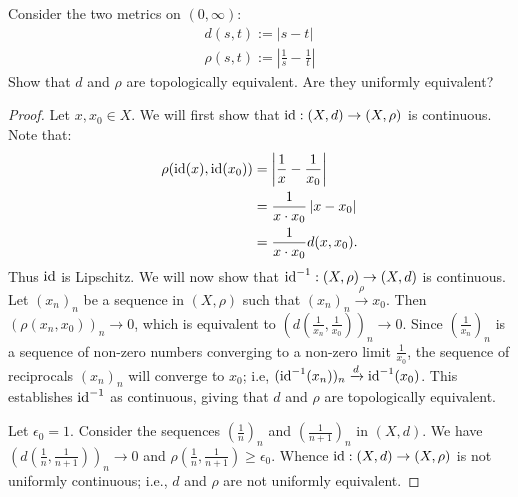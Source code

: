 \documentclass[11pt,twoside,openany]{memoir}
\begin{document}
    \addtocounter{exercise}{1}
    \iffalse
    \begin{exercise}
        Let $(X,d)$ be a metric space, $f,g:X \rightarrow F$ continuous maps, and $a \in F$. Show that $f+g$, $fg$, and $\alpha f$ are continuous.
    \end{exercise}
        \begin{proof}
            
        \end{proof}
    \fi
    \begin{exercise}
        Consider the two metrics on $(0,\infty)$:
            \begin{equation*}
            \begin{split}
                d(s,t) := |s-t| \\
                \rho(s,t) := \left| \frac{1}{s} - \frac{1}{t} \right|
            \end{split}
            \end{equation*}
        Show that $d$ and $\rho$ are topologically equivalent. Are they uniformly equivalent?
    \end{exercise}
        \begin{proof}
            Let $x,x_0 \in X$. We will first show that $\operatorname{id}:(X,d) \rightarrow (X,\rho)$ is continuous. Note that:
                \begin{equation*}
                \begin{split}
                    \rho(\operatorname{id}(x),\operatorname{id}(x_0)) 
                    & = \left| \frac{1}{x} - \frac{1}{x_0} \right| \\
                    & = \frac{1}{x \cdot x_0} \left|x - x_0\right| \\
                    & = \frac{1}{x \cdot x_0} d(x,x_0).
                \end{split}
                \end{equation*}
            Thus $\operatorname{id}$ is Lipschitz. We will now show that $\operatorname{id}^{-1}:(X,\rho) \rightarrow (X,d)$ is continuous. Let $(x_n)_n$ be a sequence in $(X,\rho)$ such that $(x_n)_n \xrightarrow{\rho} x_0$. Then $(\rho(x_n,x_0))_n \rightarrow 0$, which is equivalent to $\left( d \left( \frac{1}{x_n}, \frac{1}{x_0} \right) \right)_n \rightarrow 0$. Since $\left( \frac{1}{x_n} \right)_n $ is a sequence of non-zero numbers converging to a non-zero limit $\frac{1}{x_0}$, the sequence of reciprocals $(x_n)_n$ will converge to $x_0$; i.e, $(\operatorname{id}^{-1}(x_n))_n \xrightarrow{d} \operatorname{id}^{-1}(x_0)$. This establishes $\operatorname{id}^{-1}$ as continuous, giving that $d$ and $\rho$ are topologically equivalent. 

            Let $\epsilon_0 =1$. Consider the sequences $\left( \frac{1}{n} \right)_n$ and $\left( \frac{1}{n+1} \right)_n$ in $(X,d)$. We have $\left( d \left( \frac{1}{n}, \frac{1}{n+1} \right) \right)_n \rightarrow 0$ and $\rho \left( \frac{1}{n}, \frac{1}{n+1} \right) \geq \epsilon_0$. Whence $\operatorname{id}:(X,d) \rightarrow (X,\rho)$ is not uniformly continuous; i.e., $d$ and $\rho$ are not uniformly equivalent.
        \end{proof}
\end{document}
